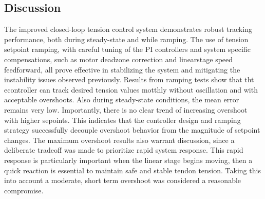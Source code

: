 \subsection{Discussion}
The improved closed-loop tension control system demonstrates robust tracking performance, both during steady-state and while ramping. The use of tension setpoint ramping, with careful tuning of the PI controllers and system specific compensations, such as motor deadzone correction and linearstage speed feedforward, all prove effective in stabilizing the system and mitigating the instability issues observed previously.
\newline \newline
Results from ramping tests show that tht econtroller can track desired tension values motthly without oscillation and with acceptable overshoots. Also during steady-state conditions, the mean error remains very low. Importantly, there is no clear trend of increasing overshoot with higher sepoints. This indicates that the controller design and ramping strategy successfully decouple overshoot behavior from the magnitude of setpoint changes.
\newline \newline 
The maximum overshoot results also warrant discussion, since a deliberate tradeoff was made to prioritize rapid system response. This rapid response is particularly important when the linear stage begins moving, then a quick reaction is essential to maintain safe and stable tendon tension. Taking this into account a moderate, short term overshoot was considered a reasonable compromise.



